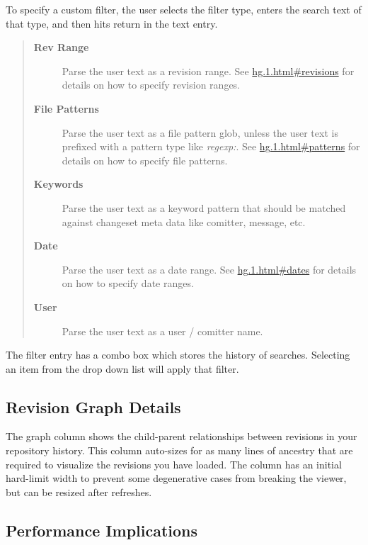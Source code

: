 \documentclass[letterpaper,10pt,english]{manual}
\begin{document}
To specify a custom filter, the user selects the filter type, enters
the search text of that type, and then hits return in the text entry.
\begin{quote}
\begin{description}
\item[\textbf{Rev Range}]
Parse the user text as a revision range.  See
\href{http://www.selenic.com/mercurial/hg.1.html\#revisions}{hg.1.html\#revisions}
for details on how to specify revision ranges.

\item[\textbf{File Patterns}]
Parse the user text as a file pattern glob, unless the user text
is prefixed with a pattern type like \emph{regexp:}.  See
\href{http://www.selenic.com/mercurial/hg.1.html\#patterns}{hg.1.html\#patterns}
for details on how to specify file patterns.

\item[\textbf{Keywords}]
Parse the user text as a keyword pattern that should be matched
against changeset meta data like comitter, message, etc.

\item[\textbf{Date}]
Parse the user text as a date range.  See
\href{http://www.selenic.com/mercurial/hg.1.html\#dates}{hg.1.html\#dates}
for details on how to specify date ranges.

\item[\textbf{User}]
Parse the user text as a user / comitter name.

\end{description}
\end{quote}

The filter entry has a combo box which stores the history of searches.
Selecting an item from the drop down list will apply that filter.


\subsection{Revision Graph Details}

The graph column shows the child-parent relationships between revisions
in your repository history.  This column auto-sizes for as many lines of
ancestry that are required to visualize the revisions you have loaded.
The column has an initial hard-limit width to prevent some degenerative
cases from breaking the viewer, but can be resized after refreshes.


\subsection{Performance Implications}
\end{document}

